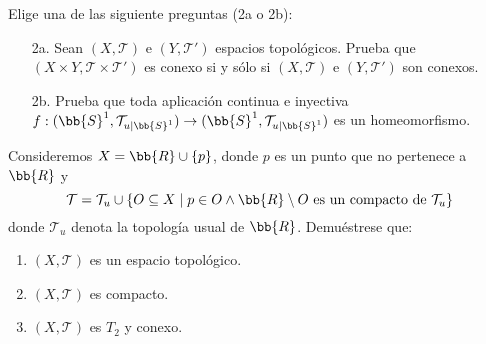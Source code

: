 \documentclass[12pt]{article}
\newcounter{ejercicio}[section] %
\newcounter{ejercicio}
\newcommand{\resetearcontador}{%
  \setcounter{ejercicio}{0} %
}
\begin{document}
    \begin{ejercicio}[2.5 puntos]
        Elige una de las siguiente preguntas (2a o 2b):
        \begin{enumerate}
            \item[2a.] Sean $(X, \mathcal{T})$ e $(Y, \mathcal{T}')$ espacios topológicos. Prueba que $(X\times Y, \mathcal{T}\times \mathcal{T}')$ es conexo si y sólo si $(X, \mathcal{T})$ e $(Y, \mathcal{T}')$ son conexos.
            \item[2b.] Prueba que toda aplicación continua e inyectiva $f:(\bb{S}^1, \mathcal{T}_{u|\bb{S}^1}) \rightarrow (\bb{S}^1, \mathcal{T}_{u|\bb{S}^1})$ es un homeomorfismo.
        \end{enumerate}
    \end{ejercicio}


    \begin{ejercicio}[3 puntos]
        Consideremos $X = \bb{R} \cup \{p\}$, donde $p$ es un punto que no pertenece a $\bb{R}$ y 
        $$\mathcal{T} = \mathcal{T}_u \cup \{O \subseteq X \mid p \in O \land \bb{R}\setminus O \mbox{ es un compacto de } \mathcal{T}_u\}$$
        donde $\mathcal{T}_u$ denota la topología usual de $\bb{R}$. Demuéstrese que:
        \begin{enumerate}[label=(\alph*)]
            \item $(X,\mathcal{T})$ es un espacio topológico.
            \item $(X,\mathcal{T})$ es compacto.
            \item $(X,\mathcal{T})$ es $T_2$ y conexo.
        \end{enumerate}
    \end{ejercicio}
    
    \newpage
    \           %
    \newpage
    \resetearcontador
\end{document}
